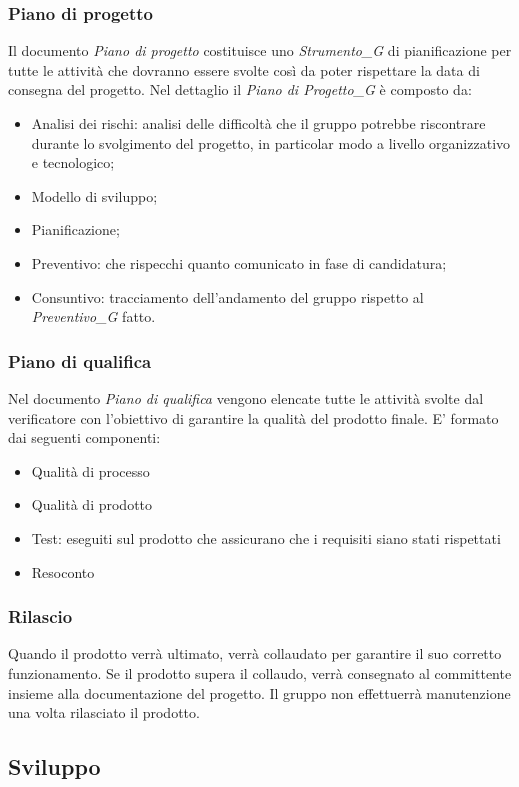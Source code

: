 \subsubsection{Piano di progetto}
Il documento \textit{Piano di progetto} costituisce uno \textit{Strumento_G} di pianificazione per tutte le attività che dovranno essere svolte così da poter rispettare la data di consegna del progetto.
Nel dettaglio il \textit{Piano di Progetto_G} è composto da:
\begin{itemize}
    \item Analisi dei rischi: analisi delle difficoltà che il gruppo potrebbe riscontrare durante lo svolgimento del progetto, in particolar modo a livello organizzativo e tecnologico;
    \item Modello di sviluppo;
    \item Pianificazione;
    \item Preventivo: che rispecchi quanto comunicato in fase di candidatura;
    \item Consuntivo: tracciamento dell'andamento del gruppo rispetto al \textit{Preventivo_G} fatto.
\end{itemize}
\subsubsection{Piano di qualifica}
Nel documento \textit{Piano di qualifica} vengono elencate tutte le attività svolte dal verificatore con l'obiettivo di garantire la qualità del prodotto finale.
E' formato dai seguenti componenti:
\begin{itemize}
    \item Qualità di processo
    \item Qualità di prodotto
    \item Test: eseguiti sul prodotto che assicurano che i requisiti siano stati rispettati
    \item Resoconto
\end{itemize}
\subsubsection{Rilascio}
Quando il prodotto verrà ultimato, verrà collaudato per garantire il suo corretto funzionamento. Se il prodotto supera il collaudo, verrà consegnato al committente insieme alla documentazione del progetto. 
Il gruppo non effettuerrà manutenzione una volta rilasciato il prodotto.

\subsection{Sviluppo}
